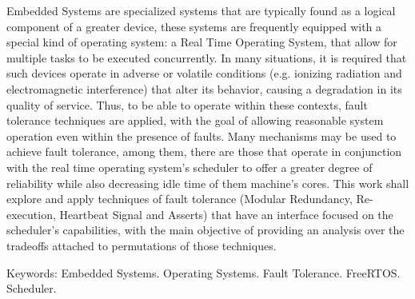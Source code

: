 \begin{Abstract}

Embedded Systems are specialized systems that are typically found as a logical component of a greater device, these systems are frequently equipped with a special kind of operating system: a Real Time Operating System, that allow for multiple tasks to be executed concurrently. In many situations, it is required that such devices operate in adverse or volatile conditions (e.g. ionizing radiation and electromagnetic interference) that alter its behavior, causing a degradation in its quality of service. Thus, to be able to operate within these contexts, fault tolerance techniques are applied, with the goal of allowing reasonable system operation even within the presence of faults. Many mechanisms may be used to achieve fault tolerance, among them, there are those that operate in conjunction with the real time operating system's scheduler to offer a greater degree of reliability while also decreasing idle time of them machine's cores. This work shall explore and apply techniques of fault tolerance (Modular Redundancy, Re-execution, Heartbeat Signal and Asserts) that have an interface focused on the scheduler's capabilities, with the main objective of providing an analysis over the tradeoffs attached to permutations of those techniques.

Keywords: Embedded Systems. Operating Systems. Fault Tolerance. FreeRTOS. Scheduler.

\end{Abstract}